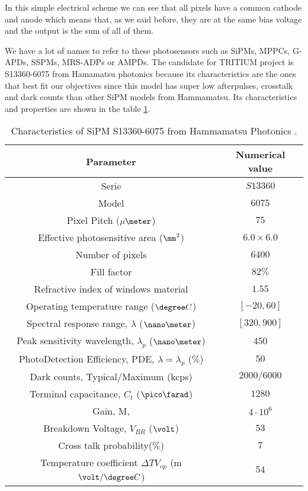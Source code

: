 In this simple electrical scheme we can see that all pixels have a common cathode and anode which means that, as we said before, they are at the same bias voltage and the output is the sum of all of them.

We have a lot of names to refer to these photosensors such as SiPMs, MPPCs, G-APDs, SSPMs, MRS-ADPs or AMPDs. The candidate for TRITIUM project is S13360-6075 from Hamamatsu photonics \cite{DataSheetHammamatsu_1_SiPM_75} because its characteristics are the ones that best fit our objectives since this model has super low afterpulses, crosstalk and dark counts than other SiPM models from Hammamatsu. Its characteristics and properties are shown in the table \ref{tab:PropertiesOfSiPM75}. 

\begin{table}[htbp]
\begin{center}
\begin{tabular}{|c|c|}
\hline
Parameter & Numerical value \\
\hline \hline \hline
Serie & $S13360$ \\ \hline
Model & $6075$ \\ \hline
Pixel Pitch ($\mu\meter$) & $75$ \\ \hline
Effective photosensitive area ($\mm^2$) & $6.0 \times 6.0$ \\ \hline
Number of pixels & $6400$ \\ \hline
Fill factor & $82\%$ \\ \hline
Refractive index of windows material & $1.55$ \\ \hline
Operating temperature range ($\degree C$)& $[-20,60]$ \\ \hline
Spectral response range, $\lambda$ ($\nano\meter$) & $[320, 900]$ \\ \hline
Peak sensitivity wavelength, $\lambda_p$ ($\nano\meter$) & $450$ \\ \hline
PhotoDetection Efficiency, PDE, $\lambda=\lambda_p$ ($\%$) & $50$ \\ \hline
Dark counts, Typical/Maximum (kcps) & $2000/6000$ \\ \hline
Terminal capacitance, $C_t$ ($\pico\farad$) & $1280$ \\ \hline
Gain, M, & $4 \cdot{} 10^6$ \\ \hline
Breakdown Voltage, $V_{BR}$ ($\volt$) & $53$ \\ \hline
Cross talk probability($\%$) & $7$ \\ \hline
Temperature coefficient $\Delta TV_{op}$ (m$\volt/\degree C$) & $54$ \\ \hline
\end{tabular}
\caption{Characteristics of SiPM S13360-6075 from Hammamatsu Photonics \cite{DataSheetHammamatsu_1_SiPM_75}.}
\label{tab:PropertiesOfSiPM75}
\end{center}
\end{table}

